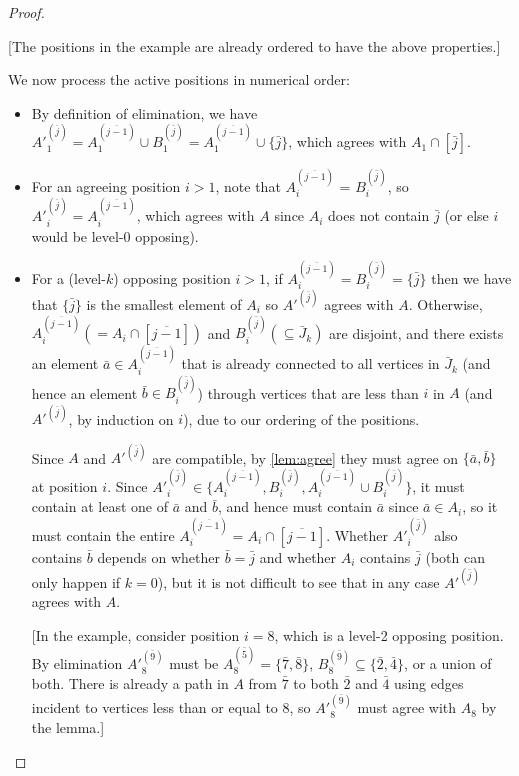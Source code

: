 \documentclass[letterpaper,reqno,11pt]{amsart}
\begin{document}
\begin{proof}
\begin{itemize}
        {\color{gray} [The positions in the example are already ordered to have the above properties.]}

        We now process the active positions in numerical order: \begin{itemize}
            \item By definition of elimination, we have $A'^{(\overline{j})}_1 = A^{(\overline{j-1})}_1 \cup B^{(\bar{j})}_1 = A^{(\overline{j-1})}_1 \cup \{\bar{j}\}$, which agrees with $A_1\cap [\bar{j}]$.
            \item For an agreeing position $i > 1$, note that $A^{(\overline{j-1})}_i$ = $B^{(\bar{j})}_i$, so $A'^{(\overline{j})}_i = A^{(\overline{j-1})}_i$, which agrees with $A$ since $A_i$ does not contain $\bar{j}$ (or else $i$ would be level-0 opposing).
            \item For a (level-$k$) opposing position $i > 1$, if $A^{(\overline{j-1})}_i = B^{(\bar{j})}_i = \{\bar{j}\}$ then we have that $\{\bar{j}\}$ is the smallest element of $A_i$ so $A'^{(\overline{j})}$ agrees with $A$. Otherwise, $A^{(\overline{j-1})}_i(=A_i\cap[\overline{j-1}])$ and $B_i^{(\bar{j})} (\subseteq \bar{J}_k)$ are disjoint, and there exists an element $\bar{a}\in A^{(\overline{j-1})}_i$ that is already connected to all vertices in $\bar{J}_k$ (and hence an element $\bar{b}\in B_i^{(\bar{j})}$) through vertices that are less than $i$ in $A$ (and $A'^{(\overline{j})}$, by induction on $i$), due to our ordering of the positions. 
            
            Since $A$ and $A'^{(\bar{j})}$ are compatible, by \cref{lem:agree} they must agree on $\{\bar{a}, \bar{b}\}$ at position $i$. Since $A'^{(\bar{j})}_i \in \{A^{(\overline{j-1})}_i, B_i^{(\bar{j})}, A^{(\overline{j-1})}_i\cup B_i^{(\bar{j})}\}$, it must contain at least one of $\bar{a}$ and $\bar{b}$, and hence must contain $\bar{a}$ since $\bar{a}\in A_i$, so it must contain the entire $A^{(\overline{j-1})}_i = A_i\cap[\overline{j-1}]$. Whether $A'^{(\bar{j})}_i$ also contains $\bar{b}$ depends on whether $\bar{b} = \bar{j}$ and whether $A_i$ contains $\bar{j}$ (both can only happen if $k = 0$), but it is not difficult to see that in any case $A'^{(\bar{j})}$ agrees with $A$.

            {\color{gray} [In the example, consider position $i = 8$, which is a level-2 opposing position. By elimination $A'^{(\bar{9})}_8$ must be $A^{(\bar{5})}_8 = \{\bar{7},\bar{8}\}$, $B^{(\bar{9})}_8 \subseteq \{\bar{2},\bar{4}\}$, or a union of both. There is already a path in $A$ from $\bar{7}$ to both $\bar{2}$ and $\bar{4}$ using edges incident to vertices less than or equal to $8$, so $A'^{(\bar{9})}_8$ must agree with $A_8$ by the lemma.]}
        \end{itemize}


\end{itemize}
\end{proof}
\end{document}

